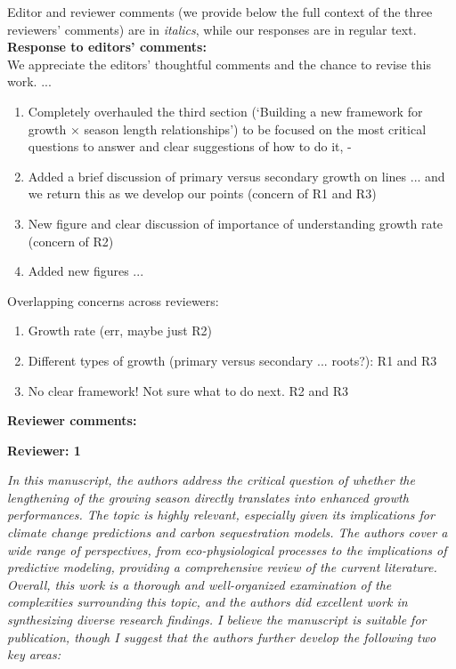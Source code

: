 \documentclass[11pt]{article}
\newcommand{\R}[1]{\label{#1}\linelabel{#1}}
\begin{document}
\setlength{\parindent}{0cm}
\setlength{\parskip}{7pt}


\renewcommand{\refname}{\CHead{}}

Editor and reviewer comments (we provide below the full context of the three reviewers' comments) are in \emph{italics}, while our responses are in regular text. \\ 

{\bf Response to editors' comments:} \\  %

We appreciate the editors' thoughtful comments and the chance to revise this work. ...

\begin{enumerate}
\item Completely overhauled the third section (`Building a new framework for growth × season length relationships') to be focused on the most critical questions to answer and clear suggestions of how to do it, \R{startframework}-\R{R3complaint1E}
\item Added a brief discussion of primary versus secondary growth on lines ...  and we return this as we develop our points  (concern of R1 and R3) 
\item New figure and clear discussion of importance of understanding growth rate (concern of R2) 
\item Added new figures ... 
\end{enumerate}

Overlapping concerns across reviewers:
\begin{enumerate}
\item Growth rate (err, maybe just R2) 
\item Different types of growth (primary versus secondary ... roots?):  R1 and R3
\item No clear framework! Not sure what to do next. R2 and R3 
\end{enumerate}

{\bf Reviewer comments:} 

{\bf Reviewer: 1}


\emph{In this manuscript, the authors address the critical question of whether the lengthening of the growing season directly translates into enhanced growth performances. The topic is highly relevant, especially given its implications for climate change predictions and carbon sequestration models. The authors cover a wide range of perspectives, from eco-physiological processes to the implications of predictive modeling, providing a comprehensive review of the current literature. Overall, this work is a thorough and well-organized examination of the complexities surrounding this topic, and the authors did excellent work in synthesizing diverse research findings. I believe the manuscript is suitable for publication, though I suggest that the authors further develop the following two key areas:}
\end{document}
